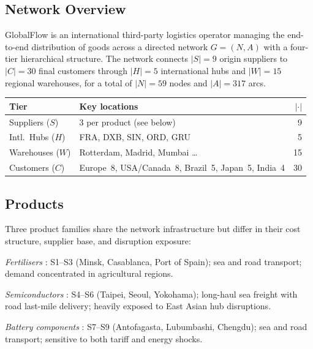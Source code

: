 
\subsection*{Network Overview}

GlobalFlow is an international third-party logistics operator managing the
end-to-end distribution of goods across a directed network
$G=(N,A)$ with a four-tier hierarchical structure.
The network connects $|S|=9$ origin suppliers to $|C|=30$ final customers
through $|H|=5$ international hubs and $|W|=15$ regional warehouses,
for a total of $|N|=59$ nodes and $|A|=317$ arcs.

\vspace{4pt}
{\small
\begin{tabularx}{\columnwidth}{@{}l X r@{}}
\toprule
\textbf{Tier} & \textbf{Key locations} & $|\cdot|$ \\
\midrule
Suppliers ($S$)   & 3 per product (see below)                  & 9  \\
Intl.\ Hubs ($H$) & FRA, DXB, SIN, ORD, GRU                   & 5  \\
Warehouses ($W$)  & Rotterdam, Madrid, Mumbai \ldots            & 15 \\
Customers ($C$)   & Europe~8, USA/Canada~8, Brazil~5, Japan~5, India~4 & 30 \\
\bottomrule
\end{tabularx}
}

\subsection*{Products}
 
Three product families share the network infrastructure but differ in their
cost structure, supplier base, and disruption exposure:
 
\begin{description}[
  labelwidth=1.2em, leftmargin=1.8em,
  itemsep=2pt, parsep=0pt, font=\bfseries\normalsize]
  \item[A] \textit{Fertilisers} : S1–S3 (Minsk, Casablanca, Port of Spain);
    sea and road transport; demand concentrated in agricultural regions.
  \item[B] \textit{Semiconductors} : S4–S6 (Taipei, Seoul, Yokohama);
    long-haul sea freight with road last-mile delivery; heavily exposed
    to East Asian hub disruptions.
  \item[C] \textit{Battery components} : S7–S9 (Antofagasta, Lubumbashi, Chengdu);
    sea and road transport; sensitive to both tariff and energy shocks.
\end{description}


